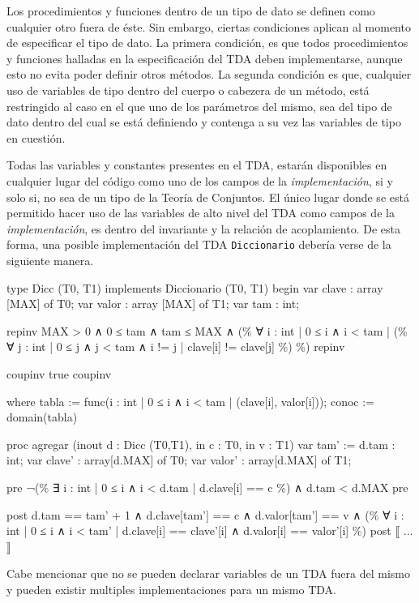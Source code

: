 Los procedimientos y funciones dentro de un tipo de dato se definen como
cualquier otro fuera de éste. Sin embargo, ciertas condiciones aplican al
momento de especificar el tipo de dato. La primera condición, es que todos
procedimientos y funciones halladas en la especificación del TDA deben
implementarse, aunque esto no evita poder definir otros métodos. La segunda
condición es que, cualquier uso de variables de tipo dentro del cuerpo o
cabezera de un método, está restringido al caso en el que uno de los
parámetros del mismo, sea del tipo de dato dentro del cual se está definiendo
y contenga a su vez las variables de tipo en cuestión.

Todas las variables y constantes presentes en el TDA, estarán disponibles en
cualquier lugar del código como uno de los campos de la
\textit{implementación}, si y solo si, no sea de un tipo de la Teoría de
Conjuntos. El único lugar donde se está permitido hacer uso de las variables
de alto nivel del TDA como campos de la \textit{implementación}, es dentro del
invariante y la relación de acoplamiento. De esta forma, una posible
implementación del TDA \texttt{Diccionario} debería verse de la siguiente
manera.

\begin{gracielacode}
type Dicc (T0, T1) implements Diccionario (T0, T1) begin
  var clave : array [MAX] of T0;
  var valor : array [MAX] of T1;
  var tam   : int;

  {repinv MAX > 0 ∧ 0 ≤ tam ∧ tam ≤ MAX ∧
    (\% ∀ i : int | 0 ≤ i ∧ i < tam
      | (\% ∀ j : int | 0 ≤ j ∧ j < tam ∧ i != j | clave[i] != clave[j] \%)
    \%)
  repinv}

  {coupinv true coupinv}

  where {
  	tabla := func({i : int | 0 ≤ i ∧ i < tam | (clave[i], valor[i])});
    conoc := domain(tabla)
  }

  proc agregar (inout d : Dicc (T0,T1), in c : T0, in v : T1)
    var tam' := d.tam : int;
    var clave'        : array[d.MAX] of T0;
    var valor'        : array[d.MAX] of T1;

    {pre ¬(\% ∃ i : int | 0 ≤ i ∧ i < d.tam | d.clave[i] == c \%) ∧ d.tam < d.MAX pre}

    {post d.tam == tam' + 1 ∧ d.clave[tam'] == c ∧  d.valor[tam'] == v
              ∧ (\% ∀ i : int | 0 ≤ i ∧ i < tam' | d.clave[i] == clave'[i]
                                                ∧ d.valor[i] == valor'[i] \%) post}
    ⟦
     ...
    ⟧
\end{gracielacode}

Cabe mencionar que no se pueden declarar variables de un TDA fuera del mismo y
pueden existir multiples implementaciones para un mismo TDA.
